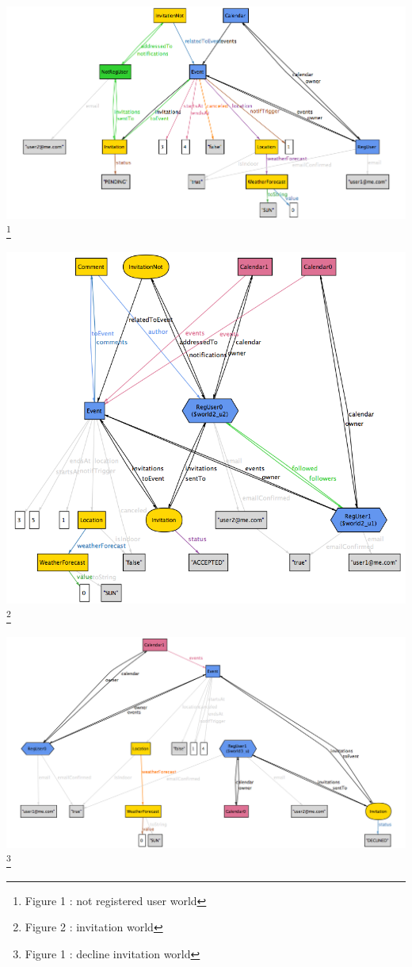 \documentclass[12pt]{book}
\begin{document}
\newpage
\begin{landscape}
\includegraphics[scale=0.7]{World1}\footnote{Figure 1 : not registered user world}\\
\end{landscape}
\begin{landscape}
\includegraphics[scale=0.6]{World2}\footnote{Figure 2 : invitation world}\\
\end{landscape}
\begin{landscape}
\includegraphics[scale=0.6]{World3}\footnote{Figure 1 : decline invitation world}\\
\end{landscape}
\end{document}
